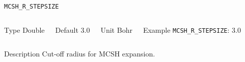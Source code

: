 	\begin{frame}[allowframebreaks]{\texttt{MCSH\_R\_STEPSIZE}} \label{MCSH_R_STEPSIZE}
	\vspace*{-12pt}
	\begin{columns}
	\begin{block}{Type}
	Double
	\end{block}
	
	\begin{block}{Default}
	3.0
	\end{block}
	
	\begin{block}{Unit}
	Bohr
	\end{block}
	
	\begin{block}{Example}
	\texttt{MCSH\_R\_STEPSIZE}: 3.0
	\end{block}
	\end{columns}
	
	\begin{block}{Description}
	Cut-off radius for MCSH expansion.
	\end{block}
	
	
	\end{frame}
	
